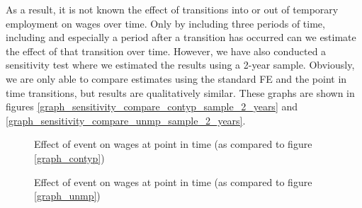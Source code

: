 As a result, it is not known the effect of transitions into or out of temporary employment on wages over time.  Only by including three periods of time, including and especially a period after a transition has occurred can we estimate the effect of that transition over time.  However, we have also conducted a sensitivity test where we estimated the results using a 2-year sample.  Obviously, we are only able to compare estimates using the standard FE and the point in time transitions, but results are qualitatively similar.  These graphs are shown in figures \ref{graph_sensitivity_compare_contyp_sample_2_years} and \ref{graph_sensitivity_compare_unmp_sample_2_years}.  

\begin{figure}
    \caption{Effect of event on wages at point in time (as compared to figure \ref{graph_contyp})}
    \label{graph_contyp_age_16_64}
\end{figure}

\begin{figure}
    \caption{Effect of event on wages at point in time (as compared to figure \ref{graph_unmp})}
    \label{graph_unmp_age_16_64}
\end{figure}

